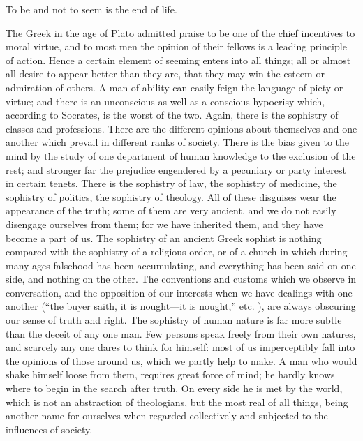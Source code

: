 \documentclass[11pt,letter]{article}
\begin{document}
\par  To be and not to seem is the end of life.

\par  The Greek in the age of Plato admitted praise to be one of the chief incentives to moral virtue, and to most men the opinion of their fellows is a leading principle of action. Hence a certain element of seeming enters into all things; all or almost all desire to appear better than they are, that they may win the esteem or admiration of others. A man of ability can easily feign the language of piety or virtue; and there is an unconscious as well as a conscious hypocrisy which, according to Socrates, is the worst of the two. Again, there is the sophistry of classes and professions. There are the different opinions about themselves and one another which prevail in different ranks of society. There is the bias given to the mind by the study of one department of human knowledge to the exclusion of the rest; and stronger far the prejudice engendered by a pecuniary or party interest in certain tenets. There is the sophistry of law, the sophistry of medicine, the sophistry of politics, the sophistry of theology. All of these disguises wear the appearance of the truth; some of them are very ancient, and we do not easily disengage ourselves from them; for we have inherited them, and they have become a part of us. The sophistry of an ancient Greek sophist is nothing compared with the sophistry of a religious order, or of a church in which during many ages falsehood has been accumulating, and everything has been said on one side, and nothing on the other. The conventions and customs which we observe in conversation, and the opposition of our interests when we have dealings with one another (“the buyer saith, it is nought—it is nought,” etc. ), are always obscuring our sense of truth and right. The sophistry of human nature is far more subtle than the deceit of any one man. Few persons speak freely from their own natures, and scarcely any one dares to think for himself: most of us imperceptibly fall into the opinions of those around us, which we partly help to make. A man who would shake himself loose from them, requires great force of mind; he hardly knows where to begin in the search after truth. On every side he is met by the world, which is not an abstraction of theologians, but the most real of all things, being another name for ourselves when regarded collectively and subjected to the influences of society.
\end{document}
